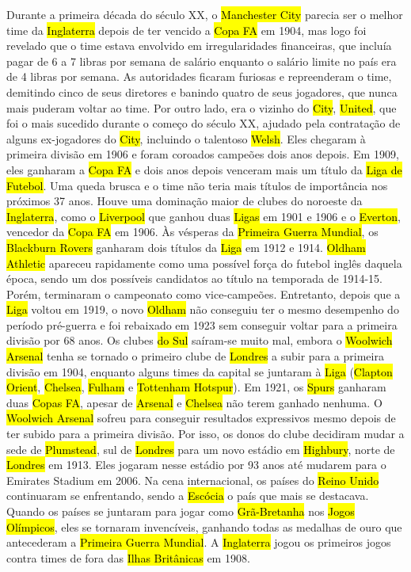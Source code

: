 \documentclass[a4paper,12pt]{article}
\begin{document}
Durante a primeira década do século XX, o \hl{Manchester City} parecia ser o melhor time da \hl{Inglaterra} depois de ter vencido a \hl{Copa FA} em 1904, mas logo foi revelado que o time estava envolvido em irregularidades financeiras, que incluía pagar de 6 a 7 libras por semana de salário enquanto o salário limite no país era de 4 libras por semana. As autoridades ficaram furiosas e repreenderam o time, demitindo cinco de seus diretores e banindo quatro de seus jogadores, que nunca mais puderam voltar ao time.
Por outro lado, era o vizinho do \hl{City}, \hl{United}, que foi o mais sucedido durante o começo do século XX, ajudado pela contratação de alguns ex-jogadores do \hl{City}, incluindo o talentoso \hl{Welsh}. Eles chegaram à primeira divisão em 1906 e foram coroados campeões dois anos depois. Em 1909, eles ganharam a \hl{Copa FA} e dois anos depois venceram mais um título da \hl{Liga de Futebol}. Uma queda brusca e o time não teria mais títulos de importância nos próximos 37 anos. Houve uma dominação maior de clubes do noroeste da \hl{Inglaterra}, como o \hl{Liverpool} que ganhou duas \hl{Ligas} em 1901 e 1906 e o \hl{Everton}, vencedor da \hl{Copa FA} em 1906. Às vésperas da \hl{Primeira Guerra Mundial}, os \hl{Blackburn Rovers} ganharam dois títulos da \hl{Liga} em 1912 e 1914. \hl{Oldham Athletic} apareceu rapidamente como uma possível força do futebol inglês daquela época, sendo um dos possíveis candidatos ao título na temporada de 1914-15. Porém, terminaram o campeonato como vice-campeões. Entretanto, depois que a \hl{Liga} voltou em 1919, o novo \hl{Oldham} não conseguiu ter o mesmo desempenho do período pré-guerra e foi rebaixado em 1923 sem conseguir voltar para a primeira divisão por 68 anos.
Os clubes \hl{do Sul} saíram-se muito mal, embora o \hl{Woolwich Arsenal} tenha se tornado o primeiro clube de \hl{Londres} a subir para a primeira divisão em 1904, enquanto alguns times da capital se juntaram à \hl{Liga} (\hl{Clapton Orient}, \hl{Chelsea}, \hl{Fulham} e \hl{Tottenham Hotspur}). Em 1921, os \hl{Spurs} ganharam duas \hl{Copas FA}, apesar de \hl{Arsenal} e \hl{Chelsea} não terem ganhado nenhuma.
O \hl{Woolwich Arsenal} sofreu para conseguir resultados expressivos mesmo depois de ter subido para a primeira divisão. Por isso, os donos do clube decidiram mudar a sede de \hl{Plumstead}, sul de \hl{Londres} para um novo estádio em \hl{Highbury}, norte de \hl{Londres} em 1913. Eles jogaram nesse estádio por 93 anos até mudarem para o Emirates Stadium em 2006.
Na cena internacional, os países do \hl{Reino Unido} continuaram se enfrentando, sendo a \hl{Escócia} o país que mais se destacava. Quando os países se juntaram para jogar como \hl{Grã-Bretanha} nos \hl{Jogos Olímpicos}, eles se tornaram invencíveis, ganhando todas as medalhas de ouro que antecederam a \hl{Primeira Guerra Mundial}. A \hl{Inglaterra} jogou os primeiros jogos contra times de fora das \hl{Ilhas Britânicas} em 1908.
\end{document}
